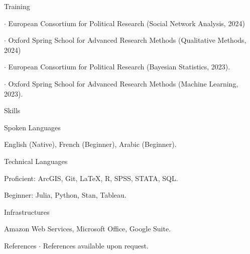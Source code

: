 \documentclass[10pt]{resume} %
\begin{document}
	\begin{rSection}{Training} \itemsep -5pt
		
		\item $\cdot$ European Consortium for Political Research (Social Network Analysis, 2024)
    
    \item $\cdot$ Oxford Spring School for Advanced Research Methods (Qualitative Methods, 2024)
		
		\item $\cdot$ European Consortium for Political Research (Bayesian Statistics, 2023).
		
		\item $\cdot$ Oxford Spring School for Advanced Research Methods (Machine Learning, 2023).
	
	\end{rSection}

	\begin{rSection}{Skills} \itemsep -5pt
		
		\begin{rSubsection}{Spoken Languages}{}{}
			
			\item English (Native), French (Beginner), Arabic (Beginner).
		
		\end{rSubsection}
		
		\begin{rSubsection}{Technical Languages}{}{}
			
			\item Proficient: ArcGIS, Git, \LaTeX, R, SPSS, STATA, SQL.
			
			\item Beginner: Julia, Python, Stan, Tableau.
		
		\end{rSubsection}
		
		\begin{rSubsection}{Infrastructures}{}{}
			
			\item Amazon Web Services, Microsoft Office, Google Suite.
		
		\end{rSubsection}
		
	\end{rSection}
	
	\begin{rSection}{References}
		$\cdot$ References available upon request. 
	\end{rSection}
	
\end{document}
